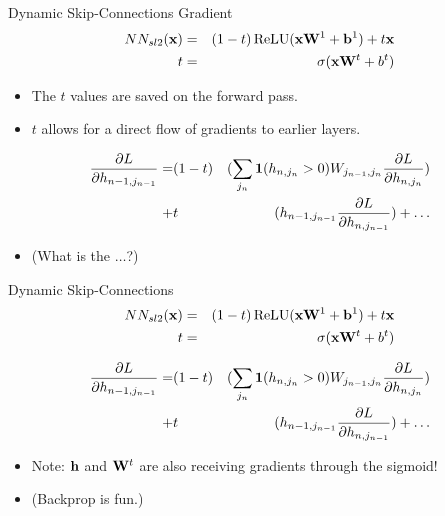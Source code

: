 \documentclass{beamer}
\begin{document}
\begin{frame}{Dynamic Skip-Connections Gradient}
  \begin{eqnarray*}
    NN_{sl2}(\boldx) &=& (1-t) \relu(\boldx \boldW^1 + \boldb^1) + t \boldx \\
    t &=& \sigma(\boldx \boldW^t + b^t) 
  \end{eqnarray*}
  \begin{itemize}
  \item The $t$ values are saved on the forward pass.
  \item $t$ allows for a direct flow of gradients to earlier layers. 
  \end{itemize}


  \begin{eqnarray*}
     \frac{\partial L}{\partial h_{n-1,j_{n-1}} }  =  &(1-t)& (\sum_{j_n}   \mathbf{1}(h_{n, j_n} > 0) W_{j_{n-1},j_n} \frac{\partial L}{\partial h_{n, j_n}}) \\
    + &t& ( h_{n-1, j_{n-1}} \frac{\partial L}{\partial h_{n, j_{n-1}}}) + \ldots \\ 
  \end{eqnarray*}

  \begin{itemize}
  \item (What is the $\ldots$?)
  \end{itemize}

\end{frame}



\begin{frame}{Dynamic Skip-Connections}
  \begin{eqnarray*}
    NN_{sl2}(\boldx) &=& (1-t) \relu(\boldx \boldW^1 + \boldb^1) + t \boldx \\
    t &=& \sigma(\boldx \boldW^t + b^t) 
  \end{eqnarray*}


  \begin{eqnarray*}
     \frac{\partial L}{\partial h_{n-1,j_{n-1}} }  =  &(1-t)& (\sum_{j_n}   \mathbf{1}(h_{n, j_n} > 0) W_{j_{n-1},j_n} \frac{\partial L}{\partial h_{n, j_n}}) \\
    + &t& ( h_{n-1, j_{n-1}} \frac{\partial L}{\partial h_{n, j_{n-1}}}) + \ldots \\ 
  \end{eqnarray*}

  \begin{itemize}
  \item Note: $\mathbf{h}$ and $\mathbf{W}^t$ are also receiving gradients through the sigmoid!
    \air
  \item (Backprop is fun.)
  \end{itemize}
\end{frame}
\end{document}
